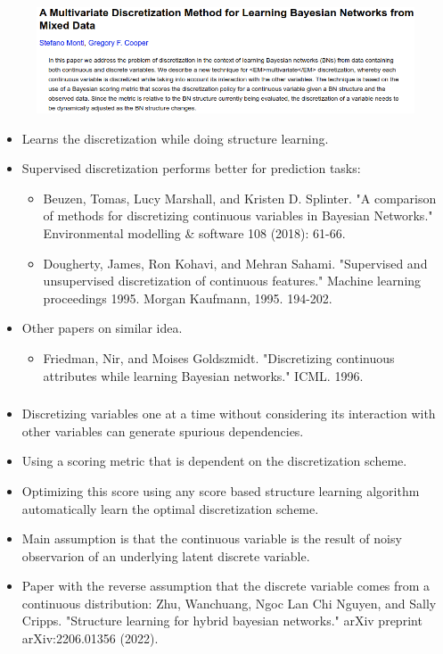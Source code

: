\documentclass{beamer}
\begin{document}
\begin{frame}
	\frametitle{}
	\begin{figure}
		\centering
		\includegraphics[scale=0.4]{imgs/supervised.png}
	\end{figure}
	\begin{itemize}
		\item Learns the discretization while doing structure learning.
		\item Supervised discretization performs better for prediction tasks:
			\begin{itemize}
				\item \scriptsize{Beuzen, Tomas, Lucy Marshall, and Kristen D. Splinter. "A comparison of methods for discretizing continuous variables in Bayesian Networks." Environmental modelling \& software 108 (2018): 61-66.}
				\item \scriptsize{Dougherty, James, Ron Kohavi, and Mehran Sahami. "Supervised and unsupervised discretization of continuous features." Machine learning proceedings 1995. Morgan Kaufmann, 1995. 194-202.}
			\end{itemize}
		\item Other papers on similar idea.
			\begin{itemize}
				\item \scriptsize{Friedman, Nir, and Moises Goldszmidt. "Discretizing continuous attributes while learning Bayesian networks." ICML. 1996.}
			\end{itemize}
	\end{itemize}
\end{frame}
\begin{frame}
	\frametitle{}
	\begin{itemize}
		\item Discretizing variables one at a time without considering its interaction with other variables can generate spurious dependencies.
		\item Using a scoring metric that is dependent on the discretization scheme.
		\item Optimizing this score using any score based structure learning algorithm automatically learn the optimal discretization scheme.
		\item Main assumption is that the continuous variable is the result of noisy observarion of an underlying latent discrete variable.
		\item Paper with the reverse assumption that the discrete variable comes from a continuous distribution: \newline
			\scriptsize{Zhu, Wanchuang, Ngoc Lan Chi Nguyen, and Sally Cripps. "Structure learning for hybrid bayesian networks." arXiv preprint arXiv:2206.01356 (2022).}
	\end{itemize}
\end{frame}
\end{document}
